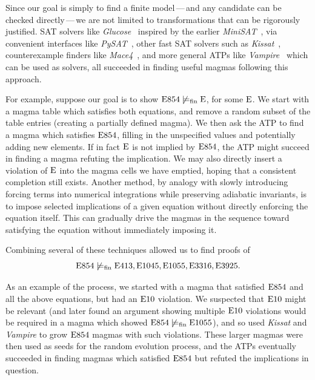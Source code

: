  Since our goal is simply to find a finite model\,---\,and any candidate can be checked directly\,---\,we are not limited to transformations that can be rigorously justified.
  SAT solvers like
 \emph{Glucose}~\cite{DBLP:conf/ijcai/AudemardS09,DBLP:conf/cp/AudemardS12} inspired by the earlier \emph{MiniSAT}~\cite{DBLP:conf/sat/EenS03},
 via convenient interfaces like \emph{PySAT}~\cite{imms-sat18, itk-sat24},
 other fast SAT solvers such as \emph{Kissat}~\cite{BiereFazekasFleuryHeisinger-SAT-Competition-2020-solvers},
 counterexample finders like \emph{Mace4}~\cite{prover9-mace4}, and more general ATPs like
 \emph{Vampire}~\cite{DBLP:conf/cav/KovacsV13} which can be used as solvers, all succeeded in finding useful magmas following this approach.

 For example, suppose our goal is to show $\mathrm{E}854 \not\models_{\mathrm{fin}} \mathrm{E}$, for some $\mathrm{E}$.  We start with a magma table which
 satisfies both equations, and remove a random subset of the table entries (creating a partially defined magma).  We then
 ask the ATP to find a magma which satisfies $\mathrm{E}854$, filling in the unspecified values and potentially adding new elements.
 If in fact $\mathrm{E}$ is not implied by $\mathrm{E}854$, the ATP might succeed in finding a magma refuting the implication.
 We may also directly insert a violation of $\mathrm{E}$ into the magma cells we have emptied, hoping that a consistent completion still exists.
 Another method, by analogy with slowly introducing forcing terms into numerical integrations while preserving adiabatic invariants,
 is to impose selected implications of a given equation without directly enforcing the equation itself.
 This can gradually drive the magmas in the sequence toward satisfying the equation without immediately imposing it.

Combining several of these techniques allowed us to find proofs of
$$\mathrm{E}854 \not\models_{\mathrm{fin}} \mathrm{E}413, \mathrm{E}1045, \mathrm{E}1055, \mathrm{E}3316, \mathrm{E}3925.$$

As an example of the process, we started with a magma that satisfied $\mathrm{E}854$ and all the above equations,
but had an $\mathrm{E}10$ violation.  We suspected that $\mathrm{E}10$ might be relevant (and later found an
argument showing multiple $\mathrm{E}10$ violations would be required in a magma which showed $\mathrm{E}854 \not\models_{\mathrm{fin}} \mathrm{E}1055$),
and so used \emph{Kissat} and \emph{Vampire} to grow $\mathrm{E}854$ magmas with such violations.  These larger magmas were then used as
seeds for the random evolution process, and the ATPs eventually succeeded in finding magmas which satisfied $\mathrm{E}854$ but refuted
the implications in question.

